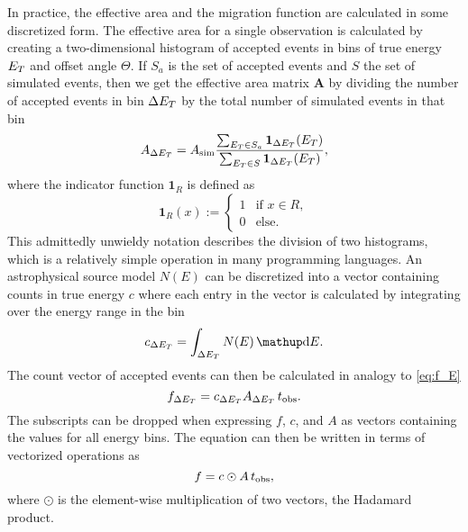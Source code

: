 In practice, the effective area and the migration function are calculated in some discretized form. 
The effective area for a single observation is calculated by creating a two-dimensional histogram of accepted events 
in bins of true energy $E_T$ and offset angle $\Theta$. 
If $S_a$ is the set of accepted events and $S$ the set of simulated events, then we get the effective area matrix $\mathbf{A}$
by dividing the number of accepted events in bin $\Delta E_T$ by the total number of simulated events in that bin
\begin{equation}
  A_{\Delta E_T} = A_{\mathrm{sim}} \frac{\sum_{{E_T \in S_a}} \mathbf{1}_{\Delta E_T}(E_T) }{\sum_{{E_T \in S}} \mathbf{1}_{\Delta E_T}(E_T)},
\end{equation}
where the indicator function $\mathbf{1}_{R}$ is defined as
\begin{equation}
\mathbf{1}_{R}(x):=\begin{cases}
  1 & {\text{if }} x \in R, \\
  0 & {\text{else. }}
\end{cases}
\end{equation}
This admittedly unwieldy notation describes the division of two histograms, which is a relatively simple operation in many programming languages.
An astrophysical source model $N(E)$ can be discretized into a vector containing counts in true energy $c$ where each entry 
in the vector is calculated by integrating over the energy range in the bin 
\begin{equation*}
  c_{\Delta \etrue} = \int_{\Delta \etrue} N(E) \diff{E}.
\end{equation*}
The count vector of accepted events can then be calculated in analogy to \cref{eq:f_E}
\begin{equation*}
  f_{\Delta E_T} = c_{\Delta E_T}  A_{\Delta E_T} \, t_{\text{obs}}.
\end{equation*}
The subscripts can be dropped when expressing $f$, $c$, and $A$ as vectors containing the values for all energy bins. The equation can then be written in terms of vectorized operations as 
\begin{equation*}
  f = c \odot A \, t_{\text{obs}},
\end{equation*}
where $\odot$ is the element-wise multiplication of two vectors, the Hadamard product.


